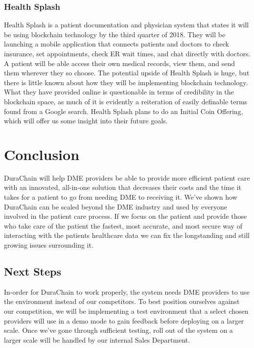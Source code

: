 \documentclass[letterpaper]{article}
\begin{document}
  \subsubsection{Health Splash}
  Health Splash is a patient documentation and physician system that states it will be using blockchain technology by the third quarter of 2018. They will be launching a mobile application that connects patients and doctors to check insurance, set appointments, check ER wait times, and chat directly with doctors. A patient will be able access their own medical records, view them, and send them wherever they so choose.
%
  The potential upside of Health Splash is huge, but there is little known about how they will be implementing blockchain technology. What they have provided online is questionable in terms of credibility in the blockchain space, as much of it is evidently a reiteration of easily definable terms found from a Google search. Health Splash plans to do an Initial Coin Offering, which will offer us some insight into their future goals.
%
\section{Conclusion}
DuraChain will help DME providers be able to provide more efficient patient care with an innovated, all-in-one solution that decreases their costs and the time it takes for a patient to go from needing DME to receiving it. We’ve shown how DuraChain can be scaled beyond the DME industry and used by everyone involved in the patient care process. If we focus on the patient and provide those who take care of the patient the fastest, most accurate, and most secure way of interacting with the patients healthcare data we can fix the longstanding and still growing issues surrounding it.
%
%
\subsection{Next Steps}
In-order for DuraChain to work properly, the system needs DME providers to use the environment instead of our competitors. To best position ourselves against our competition, we will be implementing a test environment that a select chosen providers will use in a demo mode to gain feedback before deploying on a larger scale. Once we’ve gone through sufficient testing, roll out of the system on a larger scale will be handled by our internal Sales Department.
%
\end{document}
